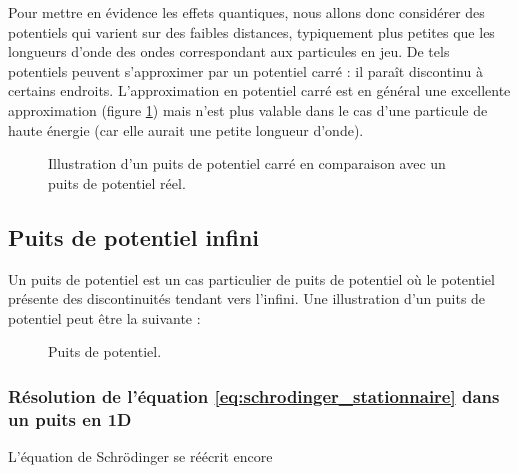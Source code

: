 \documentclass[12pt, a4paper]{book}
\begin{document}
Pour mettre en évidence les effets quantiques, nous allons donc considérer des potentiels qui varient sur des faibles distances, typiquement plus petites que les longueurs d'onde des ondes correspondant aux particules en jeu. De tels potentiels peuvent s'approximer par un potentiel carré : il paraît discontinu à certains endroits. L'approximation en potentiel carré est en général une excellente approximation (figure \ref{fig:potentiel_carre}) mais n'est plus valable dans le cas d'une particule de haute énergie (car elle aurait une petite longueur d'onde). \\

\begin{figure}[h]
\centering
\scalebox{1}{}
\caption{Illustration d'un puits de potentiel carré en comparaison avec un puits de potentiel réel.}
\label{fig:potentiel_carre}
\end{figure}
\subsection{Puits de potentiel infini}
Un puits de potentiel est un cas particulier de puits de potentiel où le potentiel présente des discontinuités tendant vers l'infini. Une illustration d'un puits de potentiel peut être la suivante :
\begin{figure}[h]
\centering
\scalebox{1}{}
\caption{Puits de potentiel.}
\label{fig:puits_potentiel}
\end{figure}
\subsubsection{Résolution de l'équation \eqref{eq:schrodinger_stationnaire} dans un puits en 1D}
L'équation de Schrödinger se réécrit encore 
\end{document}
